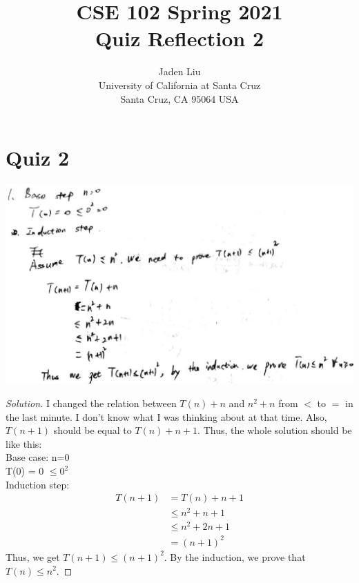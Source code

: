 \documentclass[12pt]{article}
\begin{document}
\title{ CSE 102 Spring 2021\\
	Quiz Reflection 2}

\author{Jaden Liu \\ 
University of California at Santa Cruz\\
Santa Cruz, CA 95064 USA }

\maketitle


\section{Quiz 2} 
\includegraphics[scale=0.35]{1.png}
\begin{proof}[Solution]
	I changed the relation between $T(n)+n$ and $n^2 + n$ from $<$ to $=$ in the last minute. I don't know what I was thinking about at that time. Also, $T(n+1)$ should be equal to $T(n)+n+1$.
	Thus, the whole solution should be like this:\\
	Base case: n=0\\
	T(0) = 0  $\le0^2$\\
	Induction step:
	\begin{align*}
		T(n+1)&=T(n)+n+1\\
		&\le n^2+n+1\\
		&\le n^2+2n+1\\
		&=(n+1)^2
	\end{align*}
Thus, we get $T(n+1)\le(n+1)^2$. By the induction, we prove that $T(n)\le n^2$.
\end{proof}
\bigskip




\begin{thebibliography}{so}
\end{thebibliography}
\end{document}
